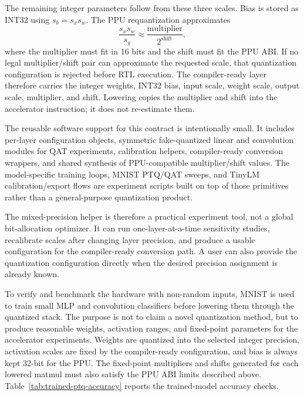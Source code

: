 \documentclass[a4paper, 12pt, titlepage]{article}
\begin{document}
The remaining integer parameters follow from these three scales. Bias is stored as INT32 using \(s_b=s_xs_w\). The PPU requantization approximates
\[
    \frac{s_xs_w}{s_y} \approx \frac{\text{multiplier}}{2^{\text{shift}}},
\]
where the multiplier must fit in 16 bits and the shift must fit the PPU ABI. If no legal multiplier/shift pair can approximate the requested scale, that quantization configuration is rejected before RTL execution. The compiler-ready layer therefore carries the integer weights, INT32 bias, input scale, weight scale, output scale, multiplier, and shift. Lowering copies the multiplier and shift into the accelerator instruction; it does not re-estimate them.

The reusable software support for this contract is intentionally small. It includes per-layer configuration objects, symmetric fake-quantized linear and convolution modules for QAT experiments, calibration helpers, compiler-ready conversion wrappers, and shared synthesis of PPU-compatible multiplier/shift values. The model-specific training loops, MNIST PTQ/QAT sweeps, and TinyLM calibration/export flows are experiment scripts built on top of those primitives rather than a general-purpose quantization product.

The mixed-precision helper is therefore a practical experiment tool, not a global bit-allocation optimizer. It can run one-layer-at-a-time sensitivity studies, recalibrate scales after changing layer precision, and produce a usable configuration for the compiler-ready conversion path. A user can also provide the quantization configuration directly when the desired precision assignment is already known.

To verify and benchmark the hardware with non-random inputs, MNIST is used to train small MLP and convolution classifiers before lowering them through the quantized stack. The purpose is not to claim a novel quantization method, but to produce reasonable weights, activation ranges, and fixed-point parameters for the accelerator experiments. Weights are quantized into the selected integer precision, activation scales are fixed by the compiler-ready configuration, and bias is always kept 32-bit for the PPU. The fixed-point multipliers and shifts generated for each lowered matmul must also satisfy the PPU ABI limits described above. Table~\ref{tab:trained-ptq-accuracy} reports the trained-model accuracy checks.
\end{document}
